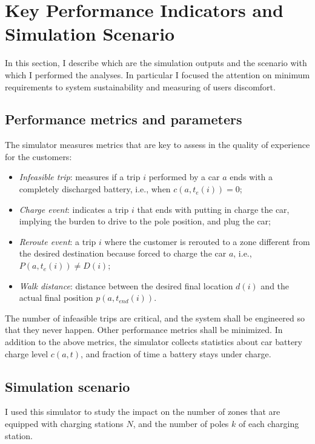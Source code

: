 \section{Key Performance Indicators and Simulation Scenario}

In this section, I describe which are the simulation outputs and the scenario with which I performed the analyses. In particular I focused the attention on minimum requirements to system sustainability and measuring of users discomfort. 

\subsection{Performance metrics and parameters}

The simulator measures metrics that are  key to assess in the quality of experience for the customers:
\begin{itemize}
	\item \emph{Infeasible trip}: measures if a trip $i$ performed by a car $a$ ends with a completely discharged battery, i.e., when $c(a,t_{e}(i))= 0$;
	\item \emph{Charge event}: indicates a trip $i$ that ends with putting in charge the car, implying the burden to drive to the pole position, and plug the car;
	\item \emph{Reroute event}: a trip $i$ where the customer is rerouted to a zone different from the  desired destination because forced to charge the car $a$, i.e., $P(a,t_{e}(i))\neq D(i)$;
	\item \emph{Walk distance}: distance between the desired final location $d(i)$ and the actual final position $p(a,t_{end}(i))$.
\end{itemize}

The number of infeasible trips are critical, and the system shall be engineered so that they never happen. Other performance metrics shall be minimized. 
In addition to the above metrics, the simulator collects statistics about car battery charge level $c(a,t)$, and fraction of time a battery stays under charge.

\subsection{Simulation scenario}

I used this simulator to study the impact on the number of zones that are equipped with charging stations $N$, and the number of poles $k$ of each charging station.

